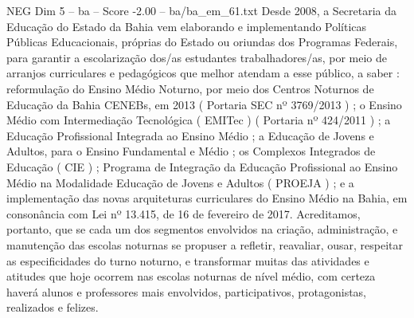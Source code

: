 \begin{textsample}{NEG Dim 5 – ba – Score -2.00 – ba/ba\_em\_61.txt}
Desde 2008, a Secretaria da Educação do Estado da Bahia vem elaborando e implementando Políticas Públicas Educacionais, próprias do Estado ou oriundas dos Programas Federais, para garantir a escolarização dos/as estudantes trabalhadores/as, por meio de arranjos curriculares e pedagógicos que melhor atendam a esse público, a saber : reformulação do Ensino Médio Noturno, por meio dos Centros Noturnos de Educação da Bahia CENEBs, em 2013 ( Portaria SEC nº 3769/2013 ) ; o Ensino Médio com Intermediação Tecnológica ( EMITec ) ( Portaria nº 424/2011 ) ; a Educação Profissional Integrada ao Ensino Médio ; a Educação de Jovens e Adultos, para o Ensino Fundamental e Médio ; os Complexos Integrados de Educação ( CIE ) ; Programa de Integração da Educação Profissional ao Ensino Médio na Modalidade Educação de Jovens e Adultos ( PROEJA ) ; e a implementação das novas arquiteturas curriculares do Ensino Médio na Bahia, em consonância com Lei nº 13.415, de 16 de fevereiro de 2017.
Acreditamos, portanto, que se cada um dos segmentos envolvidos na criação, administração, e manutenção das escolas noturnas se propuser a refletir, reavaliar, ousar, respeitar as especificidades do turno noturno, e transformar muitas das atividades e atitudes que hoje ocorrem nas escolas noturnas de nível médio, com certeza haverá alunos e professores mais envolvidos, participativos, protagonistas, realizados e felizes.

\end{textsample}
